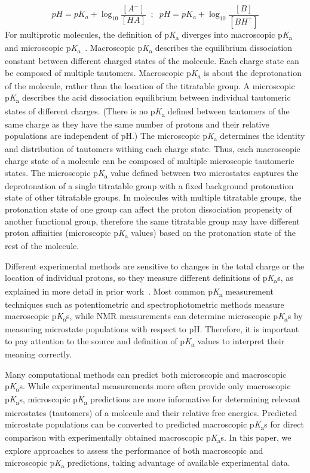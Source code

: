 \documentclass[9pt,lineno,final]{elife}
\newcommand{\pKa}{p\textit{K}\textsubscript{a}}
\begin{document}
\begin{equation}
pH = pK_a + \log_{10}{\frac{[A^-]}{[HA]}}\;\; ; \;\;pH = pK_a + \log_{10}{\frac{[B]}{[BH^+]}}
\label{eq:pH_dependency_of_deprotonation}
\end{equation}
For multiprotic molecules, the definition of \pKa{} diverges into macroscopic \pKa{} and microscopic \pKa{}~\citep{Darvey:1995:Biochem.Educ., Bodner:1986:J.Chem.Educ., Murray:1995:Anal.Chem.}. 
Macroscopic \pKa{} describes the equilibrium dissociation constant between different charged states of the molecule. 
Each charge state can be composed of multiple tautomers. 
Macroscopic \pKa{} is about the deprotonation of the molecule, rather than the location of the titratable group. 
A microscopic \pKa{} describes the acid dissociation equilibrium between individual tautomeric states of different charges. 
(There is no \pKa{} defined between tautomers of the same charge as they have the same number of protons and their relative populations are independent of pH.)
The microscopic \pKa{} determines the identity and distribution of tautomers withing each charge state.
Thus, each macroscopic charge state of a molecule can be composed of multiple microscopic tautomeric states.
The microscopic \pKa{} value defined between two microstates captures the deprotonation of a single titratable group with a fixed background protonation state of other titratable groups. 
In molecules with multiple titratable groups, the protonation state of one group can affect the proton dissociation propensity of another functional group, therefore the same titratable group may have different proton affinities (microscopic \pKa{} values) based on the protonation state of the rest of the molecule.

Different experimental methods are sensitive to changes in the total charge or the location of individual protons, so they measure different definitions of \pKa{}s, as explained in more detail in prior work~\citep{Isik:2018:J.Comput.AidedMol.Des.}. 
Most common \pKa{} measurement techniques such as potentiometric and spectrophotometric methods measure macroscopic \pKa{}s, while NMR measurements can determine microscopic \pKa{}s by measuring microstate populations with respect to pH. 
Therefore, it is important to pay attention to the source and definition of \pKa{} values to interpret their meaning correctly. 

Many computational methods can predict both microscopic and macroscopic \pKa{}s. While experimental measurements more often provide only macroscopic \pKa{}s,  microscopic \pKa{} predictions are more informative for determining relevant microstates (tautomers) of a molecule and their relative free energies. 
Predicted microstate populations can be converted to predicted macroscopic \pKa{}s for direct comparison with experimentally obtained macroscopic \pKa{}s. 
In this paper, we explore approaches to assess the performance of both macroscopic and microscopic \pKa{} predictions, taking advantage of available experimental data.
\end{document}
